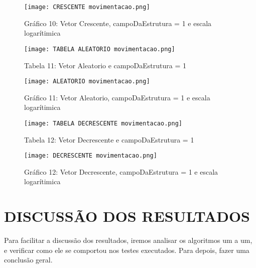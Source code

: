 \documentclass[a4paper, 12pt]{article}
\begin{document}
\begin{figure}[H] %
    \centering
    \texttt{[image: CRESCENTE movimentacao.png]}
    \captionsetup{labelformat=empty} %
    \caption{Gráfico 10: Vetor Crescente, campoDaEstrutura = 1 e escala logarítimica}
    \label{fig:exemplo}
\end{figure}

\begin{figure}[H] %
    \centering
    \texttt{[image: TABELA ALEATORIO movimentacao.png]}
    \captionsetup{labelformat=empty} %
    \caption{Tabela 11: Vetor Aleatorio e campoDaEstrutura = 1}
    \label{fig:exemplo}
\end{figure}

\begin{figure}[H] %
    \centering
    \texttt{[image: ALEATORIO movimentacao.png]}
    \captionsetup{labelformat=empty} %
    \caption{Gráfico 11: Vetor Aleatorio, campoDaEstrutura = 1 e escala logarítimica}
    \label{fig:exemplo}
\end{figure}

\begin{figure}[H] %
    \centering
    \texttt{[image: TABELA DECRESCENTE movimentacao.png]}
    \captionsetup{labelformat=empty} %
    \caption{Tabela 12: Vetor Decrescente e campoDaEstrutura = 1}
    \label{fig:exemplo}
\end{figure}

\begin{figure}[H] %
    \centering
    \texttt{[image: DECRESCENTE movimentacao.png]}
    \captionsetup{labelformat=empty} %
    \caption{Gráfico 12: Vetor Decrescente, campoDaEstrutura = 1 e escala logarítimica}
    \label{fig:exemplo}
\end{figure}

\section{DISCUSSÃO DOS RESULTADOS}
Para facilitar a discussão dos resultados, iremos analisar os algoritmos um a um, e verificar como ele se comportou nos testes executados. Para depois, fazer uma conclusão geral.
\end{document}
